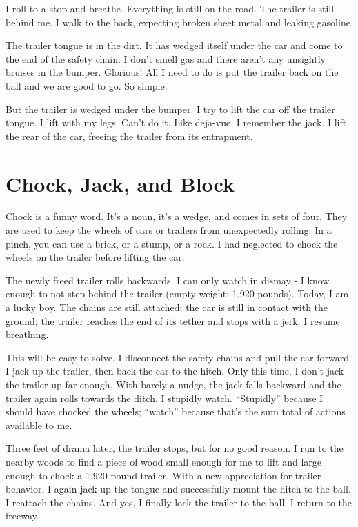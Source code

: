 \documentclass[
  letterpaper,
  DIV=11,
  numbers=noendperiod]{scrreprt}
\begin{document}
I roll to a stop and breathe. Everything is still on the road. The
trailer is still behind me. I walk to the back, expecting broken sheet
metal and leaking gasoline.

The trailer tongue is in the dirt. It has wedged itself under the car
and come to the end of the safety chain. I don't smell gas and there
aren't any unsightly bruises in the bumper. Glorious! All I need to do
is put the trailer back on the ball and we are good to go. So simple.

But the trailer is wedged under the bumper. I try to lift the car off
the trailer tongue. I lift with my legs. Can't do it. Like deja-vue, I
remember the jack. I lift the rear of the car, freeing the trailer from
its entrapment.

\section*{Chock, Jack, and Block}\label{chock-jack-and-block}


Chock is a funny word. It's a noun, it's a wedge, and comes in sets of
four. They are used to keep the wheels of cars or trailers from
unexpectedly rolling. In a pinch, you can use a brick, or a stump, or a
rock. I had neglected to chock the wheels on the trailer before lifting
the car.

The newly freed trailer rolls backwards. I can only watch in dismay - I
know enough to not step behind the trailer (empty weight: 1,920 pounds).
Today, I am a lucky boy. The chains are still attached; the car is still
in contact with the ground; the trailer reaches the end of its tether
and stops with a jerk. I resume breathing.

This will be easy to solve. I disconnect the safety chains and pull the
car forward. I jack up the trailer, then back the car to the hitch. Only
this time, I don't jack the trailer up far enough. With barely a nudge,
the jack falls backward and the trailer again rolls towards the ditch. I
stupidly watch. ``Stupidly'' because I should have chocked the wheels;
``watch'' because that's the sum total of actions available to me.

Three feet of drama later, the trailer stops, but for no good reason. I
run to the nearby woods to find a piece of wood small enough for me to
lift and large enough to chock a 1,920 pound trailer. With a new
appreciation for trailer behavior, I again jack up the tongue and
successfully mount the hitch to the ball. I reattach the chains. And
yes, I finally lock the trailer to the ball. I return to the freeway.
\end{document}
